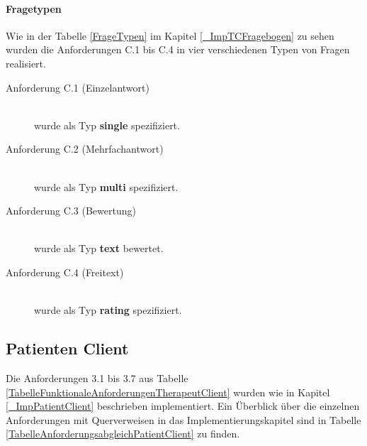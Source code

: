 \paragraph{Fragetypen}
Wie in der Tabelle \ref{FrageTypen} im Kapitel \ref{_ImpTCFragebogen} zu sehen wurden die Anforderungen C.1 bis C.4 in vier verschiedenen Typen von Fragen realisiert.


\begin{description}
	\item[Anforderung C.1 (Einzelantwort)]\hfill \\
	 wurde als Typ \textbf{single} spezifiziert.
	\item[Anforderung C.2 (Mehrfachantwort)] \hfill \\
	 wurde als Typ \textbf{multi} spezifiziert.
	\item[Anforderung C.3 (Bewertung)]\hfill \\
	wurde als Typ \textbf{text} bewertet.
	\item[Anforderung C.4 (Freitext)]\hfill \\
	wurde als Typ \textbf{rating} spezifiziert.
\end{description}

\subsection{Patienten Client}
Die Anforderungen 3.1 bis 3.7 aus Tabelle \ref{TabelleFunktionaleAnforderungenTherapeutClient}  wurden wie in Kapitel \ref{_ImpPatientClient} beschrieben implementiert. Ein Überblick über die einzelnen Anforderungen mit Querverweisen in das Implementierungskapitel sind in Tabelle \ref{TabelleAnforderungsabgleichPatientClient} zu finden.

